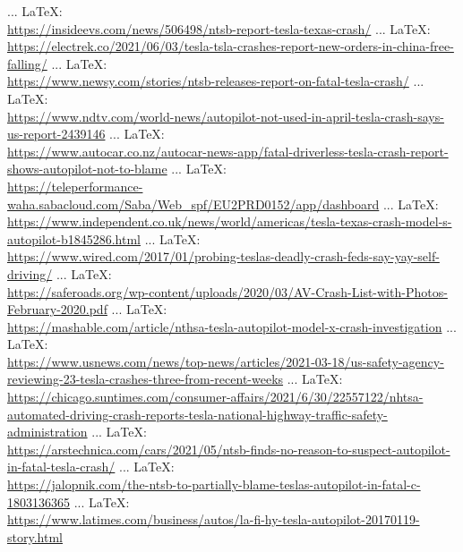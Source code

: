 \begin{thebibliography}{99}
{{{{{					 ... \LaTeX:\\ \url{https://insideevs.com/news/506498/ntsb-report-tesla-texas-crash/}
					 ... \LaTeX:\\ \url{https://electrek.co/2021/06/03/tesla-tsla-crashes-report-new-orders-in-china-free-falling/}
					 ... \LaTeX:\\ \url{https://www.newsy.com/stories/ntsb-releases-report-on-fatal-tesla-crash/}
					 ... \LaTeX:\\ \url{https://www.ndtv.com/world-news/autopilot-not-used-in-april-tesla-crash-says-us-report-2439146}
					 ... \LaTeX:\\ \url{https://www.autocar.co.nz/autocar-news-app/fatal-driverless-tesla-crash-report-shows-autopilot-not-to-blame}
					 ... \LaTeX:\\ \url{https://teleperformance-waha.sabacloud.com/Saba/Web_spf/EU2PRD0152/app/dashboard}
					 ... \LaTeX:\\ \url{https://www.independent.co.uk/news/world/americas/tesla-texas-crash-model-s-autopilot-b1845286.html}
					 ... \LaTeX:\\ \url{https://www.wired.com/2017/01/probing-teslas-deadly-crash-feds-say-yay-self-driving/}
					 ... \LaTeX:\\ \url{https://saferoads.org/wp-content/uploads/2020/03/AV-Crash-List-with-Photos-February-2020.pdf}
					 ... \LaTeX:\\ \url{https://mashable.com/article/nthsa-tesla-autopilot-model-x-crash-investigation}
					 ... \LaTeX:\\ \url{https://www.usnews.com/news/top-news/articles/2021-03-18/us-safety-agency-reviewing-23-tesla-crashes-three-from-recent-weeks}
					 ... \LaTeX:\\ \url{https://chicago.suntimes.com/consumer-affairs/2021/6/30/22557122/nhtsa-automated-driving-crash-reports-tesla-national-highway-traffic-safety-administration}
					 ... \LaTeX:\\ \url{https://arstechnica.com/cars/2021/05/ntsb-finds-no-reason-to-suspect-autopilot-in-fatal-tesla-crash/}
					 ... \LaTeX:\\ \url{https://jalopnik.com/the-ntsb-to-partially-blame-teslas-autopilot-in-fatal-c-1803136365}
					 ... \LaTeX:\\ \url{https://www.latimes.com/business/autos/la-fi-hy-tesla-autopilot-20170119-story.html}
}}}}}
\end{thebibliography}
